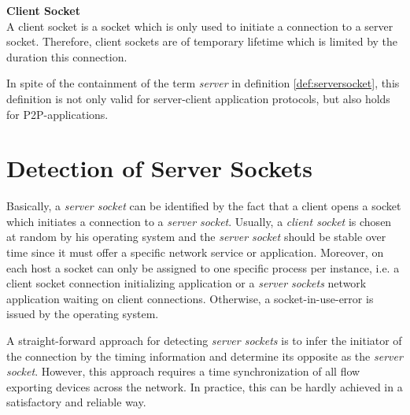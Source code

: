 \parbox{ 
\textwidth}{ 
\begin{defn}
	{\textbf{Client Socket}\\} A client socket is a socket which is only used to initiate a connection to a server socket. Therefore, client sockets are of temporary lifetime which is limited by the duration this connection. 
\end{defn}
}

In spite of the containment of the term \emph{server} in definition \ref{def:serversocket}, this definition is not only valid for server-client application protocols, but also holds for P2P-applications. 


\section{Detection of Server Sockets 
\label{section:socket_detection}}

Basically, a \emph{server socket} can be identified by the fact that a client opens a socket which initiates a connection to a \emph{server socket}. Usually, a \emph{client socket} is chosen at random by his operating system and the \emph{server socket} should be stable over time since it must offer a specific network service or application. Moreover, on each host a socket can only be assigned to one specific process per instance, i.e. a client socket connection initializing application or a \emph{server sockets} network application waiting on client connections. Otherwise, a socket-in-use-error is issued by the operating system. 

A straight-forward approach for detecting \emph{server sockets} is to infer the initiator of the connection by the timing information and determine its opposite as the \emph{server socket}. However, this approach requires a time synchronization of all flow exporting devices across the network. In practice, this can be hardly achieved in a satisfactory and reliable way.

